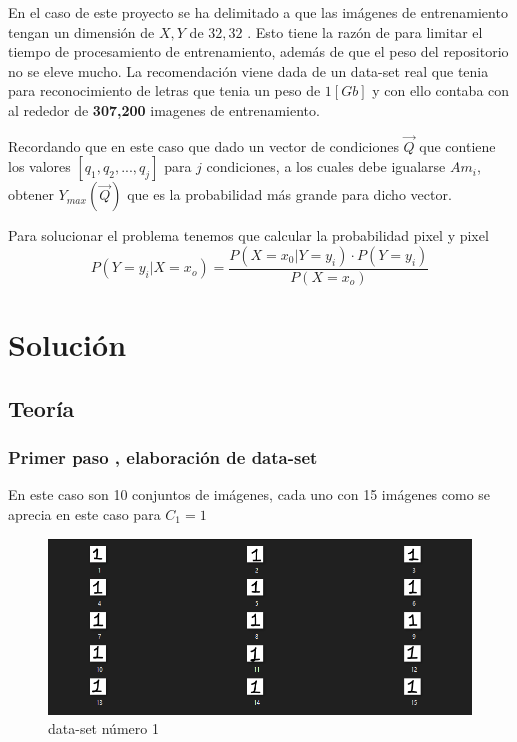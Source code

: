 \documentclass[
  spanish,
]{article}
\begin{document}
En el caso de este proyecto se ha delimitado a que las imágenes de
entrenamiento tengan un dimensión de \(X,Y\) de \(32,32\) . Esto tiene
la razón de para limitar el tiempo de procesamiento de entrenamiento,
además de que el peso del repositorio no se eleve mucho. La
recomendación viene dada de un data-set real que tenia para
reconocimiento de letras que tenia un peso de \(1[Gb]\) y con ello
contaba con al rededor de \textbf{307,200} imagenes de entrenamiento.

Recordando que en este caso que dado un vector de condiciones
\(\vec{Q}\) que contiene los valores \([q_1,q_2,...,q_j]\) para \(j\)
condiciones, a los cuales debe igualarse \(Am_i\), obtener
\(Y_{max}(\vec{Q})\) que es la probabilidad más grande para dicho
vector.

Para solucionar el problema tenemos que calcular la probabilidad pixel y
pixel \[
P(Y=y_i|X=x_o)= \frac{P(X=x_0| Y=y_i)\cdot P(Y=y_i)}{P(X=x_o)}
\]

\hypertarget{soluciuxf3n}{%
\section{Solución}\label{soluciuxf3n}}

\hypertarget{teoruxeda}{%
\subsection{Teoría}\label{teoruxeda}}

\hypertarget{primer-paso-elaboraciuxf3n-de-data-set}{%
\subsubsection{Primer paso , elaboración de
data-set}\label{primer-paso-elaboraciuxf3n-de-data-set}}

En este caso son 10 conjuntos de imágenes, cada uno con 15 imágenes como
se aprecia en este caso para \(C_1=1\)

\begin{figure}
\centering
\includegraphics{img/README/image-20220506183750690.png}
\caption{data-set número 1}
\end{figure}
\end{document}
